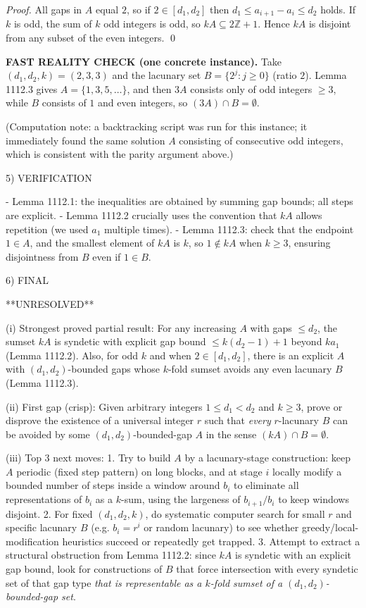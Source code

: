 \emph{Proof.}
All gaps in \(A\) equal \(2\), so if \(2\in[d_1,d_2]\) then \(d_1\le a_{i+1}-a_i\le d_2\) holds.
If \(k\) is odd, the sum of \(k\) odd integers is odd, so \(kA\subseteq 2\mathbb{Z}+1\). Hence \(kA\) is disjoint from any subset of the even integers. \qed

\textbf{FAST REALITY CHECK (one concrete instance).}
Take \((d_1,d_2,k)=(2,3,3)\) and the lacunary set \(B=\{2^j:j\ge 0\}\) (ratio \(2\)). Lemma 1112.3 gives \(A=\{1,3,5,\dots\}\), and then \(3A\) consists only of odd integers \(\ge 3\), while \(B\) consists of \(1\) and even integers, so \((3A)\cap B=\emptyset\).

(Computation note: a backtracking script was run for this instance; it immediately found the same solution \(A\) consisting of consecutive odd integers, which is consistent with the parity argument above.)

5) VERIFICATION

- Lemma 1112.1: the inequalities are obtained by summing gap bounds; all steps are explicit.
- Lemma 1112.2 crucially uses the convention that \(kA\) allows repetition (we used \(a_1\) multiple times).
- Lemma 1112.3: check that the endpoint \(1\in A\), and the smallest element of \(kA\) is \(k\), so \(1\notin kA\) when \(k\ge 3\), ensuring disjointness from \(B\) even if \(1\in B\).

6) FINAL

**UNRESOLVED**

(i) Strongest proved partial result: For any increasing \(A\) with gaps \(\le d_2\), the sumset \(kA\) is syndetic with explicit gap bound \(\le k(d_2-1)+1\) beyond \(k a_1\) (Lemma 1112.2). Also, for odd \(k\) and when \(2\in[d_1,d_2]\), there is an explicit \(A\) with \((d_1,d_2)\)-bounded gaps whose \(k\)-fold sumset avoids any even lacunary \(B\) (Lemma 1112.3).

(ii) First gap (crisp): Given arbitrary integers \(1\le d_1<d_2\) and \(k\ge 3\), prove or disprove the existence of a universal integer \(r\) such that \emph{every} \(r\)-lacunary \(B\) can be avoided by some \((d_1,d_2)\)-bounded-gap \(A\) in the sense \((kA)\cap B=\emptyset\).

(iii) Top 3 next moves:
1. Try to build \(A\) by a lacunary-stage construction: keep \(A\) periodic (fixed step pattern) on long blocks, and at stage \(i\) locally modify a bounded number of steps inside a window around \(b_i\) to eliminate all representations of \(b_i\) as a \(k\)-sum, using the largeness of \(b_{i+1}/b_i\) to keep windows disjoint.
2. For fixed \((d_1,d_2,k)\), do systematic computer search for small \(r\) and specific lacunary \(B\) (e.g. \(b_i=r^i\) or random lacunary) to see whether greedy/local-modification heuristics succeed or repeatedly get trapped.
3. Attempt to extract a structural obstruction from Lemma 1112.2: since \(kA\) is syndetic with an explicit gap bound, look for constructions of \(B\) that force intersection with every syndetic set of that gap type \emph{that is representable as a \(k\)-fold sumset of a \((d_1,d_2)\)-bounded-gap set}.

